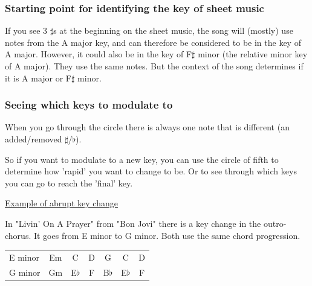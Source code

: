 \newpage

\subsubsection{Starting point for identifying the key of sheet music}

If you see 3 $\sharp$s at the beginning on the sheet music, the song will (mostly) use notes from the A major key, and can therefore be considered to be in the key of A major. However, it could also be in the key of F$\sharp$ minor (the relative minor key of A major). They use the same notes. But the context of the song determines if it is A major or F$\sharp$ minor.

\subsubsection{Seeing which keys to modulate to}

When you go through the circle there is always one note that is different (an added/removed $\sharp$/$\flat$).

So if you want to modulate to a new key, you can use the circle of fifth to determine how 'rapid' you want to change to be. Or to see through which keys you can go to reach the 'final' key.

\underline{Example of abrupt key change}

In "Livin' On A Prayer" from "Bon Jovi" there is a key change in the outro-chorus. It goes from E minor to G minor. Both use the same chord progression.

\begin{table}[h]
	\centering
	\begin{NiceTabular}{|l|c|c|c|c|c|c|}
		\hline
		 &  &  &  &  &  &  \\
		\hline
		E minor & Em & C & D & G & C & D \\
		\hline
		G minor & Gm & E$\flat$ & F & B$\flat$ & E$\flat$ & F \\
		\hline
	\end{NiceTabular}
\end{table}


